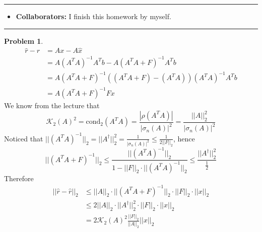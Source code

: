 \documentclass[a4paper]{article}
\theoremstyle{definition}
\newtheorem{problem}{Problem}
\theoremstyle{plain}
\newcommand{\cond}[1]{\mathrm{cond}_{#1}}
\newcommand{\dps}{\displaystyle}
\numberwithin{equation}{problem}
\begin{document}
\courseheader
{}
\rule{\textwidth}{1pt}
\begin{itemize}
\item {\bf Collaborators: \/}
  I finish this homework by myself. 
\end{itemize}
\rule{\textwidth}{1pt}

\vspace{2em}
 
\sloppy
{}

\begin{problem}
    \begin{align*}
        \hat{r}-r&=Ax-A\hat{x}\\
        &=A(A^TA)^{-1}A^Tb-A(A^TA+F)^{-1}A^Tb\\
        &=A(A^TA+F)^{-1}\left((A^TA+F)-(A^TA)\right)(A^TA)^{-1}A^Tb\\
        &=A(A^TA+F)^{-1}Fx
    \end{align*}
    We know from the lecture that
    \[\mathcal{K}_2(A)^2=\cond{2}(A^TA)=\dps\frac{|\rho(A^TA)|}{|\sigma_n(A)|^2}=\frac{||A||_2^2}{|\sigma_n(A)|^2}\]
    Noticed that  $ \dps||(A^TA)^{-1}||_2=||A^\dagger||_2^2=\frac{1}{|\sigma_n(A)|^2} \leq \frac{1}{2||F||_2} $, hence 
    \[||(A^TA+F)^{-1}||_2  \leq \frac{||(A^TA)^{-1}||_2}{1-||F||_2\cdot||(A^TA)^{-1}||_2} \leq \frac{||A^\dagger||_2^2}{\frac{1}{2}}\]
    Therefore
    \begin{align*}
        ||\hat{r}-\hat{r}||_2& \leq ||A||_2\cdot||(A^TA+F)^{-1}||_2\cdot||F||_2\cdot||x||_2\\
        & \leq 2||A||_2\cdot||A^\dagger||_2^2\cdot||F||_2\cdot||x||_2\\
        &=2\mathcal{K}_2(A)^2\frac{||F||_2}{||A||_2}||x||_2
    \end{align*}
\end{problem}
\end{document}
